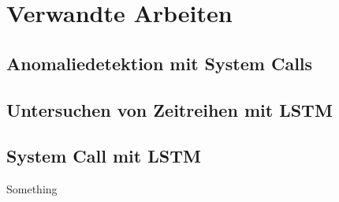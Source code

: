 \chapter{Verwandte Arbeiten}\label{ch:verwandte_arbeiten}
\section{Anomaliedetektion mit System Calls}

\section{Untersuchen von Zeitreihen mit LSTM}

\section{System Call mit LSTM}
    Something~\cite{LSTMsys}
